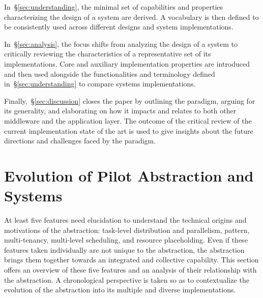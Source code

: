 \documentclass{sig-alternate}
\begin{document}
In~\S\ref{sec:understanding}, the minimal set of capabilities and properties
characterizing the design of a \pilotjob system are derived. A vocabulary is
then defined to be consistently used across different designs and
\pilotjob system implementations.

In~\S\ref{sec:analysis}, the focus shifts from analyzing the design of a
\pilotjob system to critically reviewing the characteristics of a representative
set of its implementations. Core and auxiliary implementation properties are
introduced and then used alongside the functionalities and terminology defined
in~\S\ref{sec:understanding} to compare \pilotjob systems implementations.

Finally,~\S\ref{sec:discussion} closes the paper by outlining the \pilot
paradigm, arguing for its generality, and elaborating on how it impacts and
relates to both other middleware and the application layer. The outcome of the
critical review of the current implementation state of the art is used to give
insights about the future directions and challenges faced by the \pilot
paradigm.


%
\section{Evolution of Pilot Abstraction and Systems}
\label{sec:history}


At least five features need elucidation to understand the technical origins and
motivations of the \pilot abstraction: task-level distribution and parallelism,
\MW pattern, multi-tenancy, multi-level scheduling, and resource placeholding.
Even if these features taken individually are not unique to the \pilot
abstraction, the \pilot abstraction brings them together towards an integrated
and collective capability. This section offers an overview of these five
features and an analysis of their relationship with the \pilot abstraction. A
chronological perspective is taken so as to contextualize the %
evolution of the \pilot abstraction into its multiple and diverse
implementations.
\end{document}
